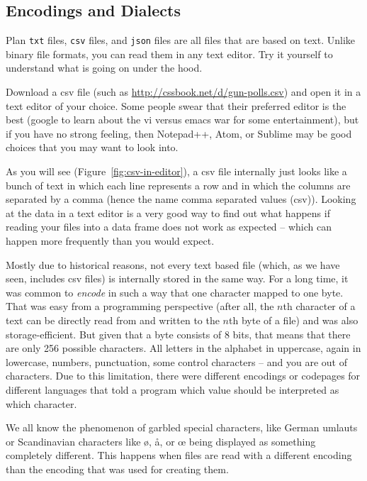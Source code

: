 \subsection{Encodings and Dialects}
\label{sec:encodings}
Plan \texttt{\small{txt}} files, \texttt{\small{csv}} files, and \texttt{\small{json}} files are all files that are based on text. Unlike binary file formats, you can read them in any text editor. Try it yourself to understand what is going on under the hood.

Download a csv file (such as \url{http://cssbook.net/d/gun-polls.csv})
and open it in a text editor of your choice. Some people swear that their preferred editor is the best (google to learn about the vi versus emacs war for some entertainment), but if you have no strong feeling, then Notepad++, Atom, or Sublime may be good choices that you may want to look into.

As you will see (Figure~\ref{fig:csv-in-editor}), a csv file internally just looks like a bunch of text in which each line represents a row and in which the columns are separated by a comma (hence the name comma separated values (csv)).
Looking at the data in a text editor is a very good way to find out what happens if reading your files into a data frame does not work as expected -- which can happen more frequently than you would expect.

Mostly due to historical reasons, not every text based file (which, as we have seen, includes csv files) is internally stored in the same way.
For a long time, it was common to \emph{encode} in such a way that one character mapped to one byte. That was easy from a programming perspective (after all, the $n$th character of a text can be directly  read from and written to the $n$th byte of a file) and was also storage-efficient. But given that a byte consists of 8 bits, that means that there are only 256 possible characters. All letters in the alphabet in uppercase, again in lowercase, numbers, punctuation, some control characters -- and you are out of characters. Due to this limitation, there were different encodings or codepages for different languages that told a program which value should be interpreted as which character.

We all know the phenomenon of garbled special characters, like German umlauts or Scandinavian characters like ø, å, or œ being displayed as something completely different. This happens when files are read with a different encoding than the encoding that was used for creating them.

